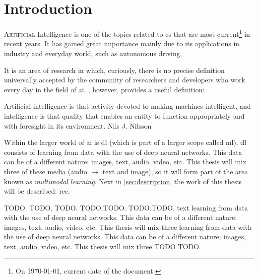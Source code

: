 

\chapter{Introduction}\label{cha:intro}


\lettrine{A}{rtificial} Intelligence is one of the topics related to \gls{cs}
that are most current\footnote{On \today, current date of the document.} in
recent years. It has gained great importance mainly due to its applications in
industry and everyday world, such as autonomous driving.

It is an area of research in which, curiously, there is no precise definition
universally accepted by the community of researchers and developers who work
every day in the field of \gls{ai}. ,
however, provides a useful definition:

\begin{quoteBox}
  Artificial intelligence is that activity devoted to making machines
  intelligent, and intelligence is that quality that enables an entity to
  function appropriately and with foresight in its environment.
  \tcblower{}Nils J. Nilsson
\end{quoteBox}

Within the larger world of \gls{ai} is \gls{dl} (which is part of a larger
scope called \gls{ml}). \gls{dl} consists of learning from data with the use of
deep neural networks. This data can be of a different nature: images, text,
audio, video, etc. This thesis will mix three of these media (audio
\(\rightarrow\) text and image), so it will form part of the area known as
\emph{multimodal learning}. Next in \vref{sec:description} the work of this
thesis will be described: \gls{rec}.%

TODO. TODO. TODO. TODO.TODO. TODO.TODO. text learning from data with the use of
deep neural networks. This data can be of a different nature: images, text,
audio, video, etc. This thesis will mix three learning from data with the use
of deep neural networks. This data can be of a different nature: images, text,
audio, video, etc. This thesis will mix three TODO TODO.


